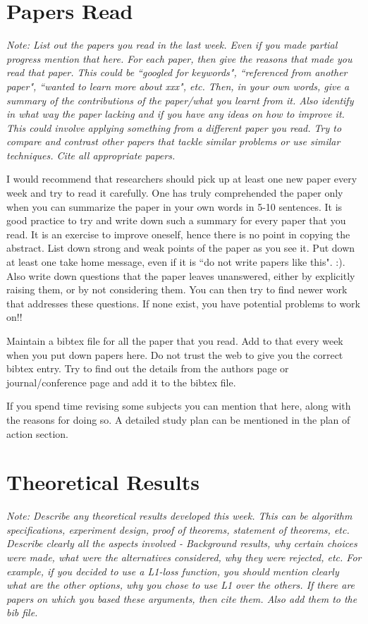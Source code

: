 \documentclass{article}
\begin{document}
\section{Papers Read}
{\it Note: List out the papers you read in the last week. Even if you made
partial progress mention that here. For each paper, then give the reasons
that made you read that paper. This could be ``googled for keywords",
``referenced from another paper", ``wanted to learn more about xxx", etc.
Then, in your own words, give a summary of the contributions of the
paper/what you learnt from it. Also identify in what way the paper lacking
and if you have any ideas on how to improve it. This could involve applying
something from a different paper you read. Try to compare and contrast
other papers that tackle similar problems or use similar techniques. Cite
all appropriate papers.

I would recommend that researchers should pick up at least one new paper
every week and try to read it carefully. One has truly comprehended the
paper only when you can summarize the paper in your own words in 5-10
sentences. It is good practice to try and write down such a summary for
every paper that you read. It is an exercise to improve oneself, hence there
is no point in copying the abstract. List down strong and weak points of the
paper as you see it. Put down at least one take home message, even if it is
``do not write papers like this". :). Also write down questions that the
paper leaves unanswered, either by explicitly raising them, or by not
considering them. You can then try to find newer work that addresses these
questions. If none exist, you have potential problems to work on!! 

Maintain a bibtex file for all the paper that you read. Add to that every
week when you put down papers here. Do not trust the web to give you the
correct bibtex entry. Try to find out the details from the authors page or
journal/conference page and add it to the bibtex file. 

If you spend time revising some subjects you can mention that here, along
with the reasons for doing so. A detailed study plan can be mentioned in the
plan of action section.
}

\section{Theoretical Results}
{\it Note: Describe any theoretical results developed this week. This can
be algorithm specifications, experiment design, proof of theorems, statement
of theorems, etc. Describe clearly all the aspects involved - Background
results, why certain choices were made, what were the alternatives
considered, why they were rejected, etc. For example, if you decided to use
a L1-loss function, you should mention clearly what are the other options,
why you chose to use L1 over the others. If there are papers on which you
based these arguments, then cite them. Also add them to the bib file. }
\end{document}
